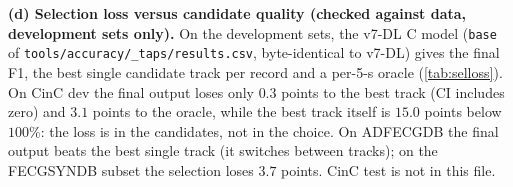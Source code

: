 \begin{finalpart}
\noindent\textbf{(d) Selection loss versus candidate quality (checked against data, development sets only).} On the development sets, the v7-DL C model (\texttt{base} of \texttt{tools/accuracy/\_taps/results.csv}, byte-identical to v7-DL) gives the final F1, the best single candidate track per record and a per-5-s oracle (\cref{tab:selloss}). On CinC dev the final output loses only $0.3$ points to the best track (CI includes zero) and $3.1$ points to the oracle, while the best track itself is $15.0$ points below $100\%$: the loss is in the candidates, not in the choice. On ADFECGDB the final output beats the best single track (it switches between tracks); on the FECGSYNDB subset the selection loses $3.7$ points. CinC test is not in this file. %

\begin{table}[t]
\fb
\caption{\fb Selection loss and candidate quality of v7-DL on the development sets (mean F1 in \%; paired bootstrap 95\% CI over records). \textbf{[L2 C model]} Source: \texttt{tools/report\_stats/out/selection\_loss.csv}.}
\label{tab:selloss}
\centering
{}
\end{table}
\end{finalpart}
